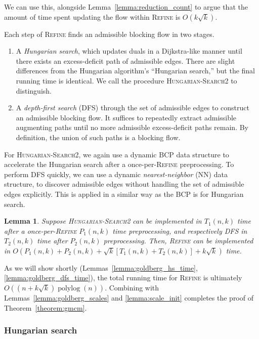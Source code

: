 \documentclass[11pt]{article}
\def\polylog{\mathop{\mathrm{polylog}}}
\theoremstyle{plain}
\newtheorem{lemma}{Lemma}
\begin{document}
We can use this, alongside Lemma~\ref{lemma:reduction_count} to argue that the
amount of time spent updating the flow within \textsc{Refine} is
$O(k\sqrt{k})$.

Each step of \textsc{Refine} finds an admissible blocking flow in two stages.
\begin{enumerate}
\item A \emph{Hungarian search}, which updates duals in a Dijkstra-like
	manner until there exists an excess-deficit path of admissible edges.
	There are slight differences from the Hungarian algorithm's ``Hungarian
	search,'' but the final running time is identical.
	We call the procedure \textsc{Hungarian-Search2} to distinguish.

\item A \emph{depth-first search} (\textsc{DFS}) through the set of admissible
	edges to construct an admissible blocking flow.
	It suffices to repeatedly extract admissible augmenting paths until
	no more admissible excess-deficit paths remain.
	By definition, the union of such paths is a blocking flow.
\end{enumerate}
For \textsc{Hungarian-Search2}, we again use a dynamic BCP data structure to
accelerate the Hungarian search after a once-per-\textsc{Refine} preprocessing.
To perform \textsc{DFS} quickly, we can use a dynamic \emph{nearest-neighbor}
(NN) data structure, to discover admissible edges without handling the set of
admissible edges explicitly.
This is applied in a similar way as the BCP is for Hungarian search.

\begin{lemma}
	Suppose \textsc{Hungarian-Search2} can be implemented in $T_1(n, k)$
	time after a once-per-\textsc{Refine} $P_1(n, k)$ time preprocessing,
	and respectively \textsc{DFS} in $T_2(n, k)$ time after $P_2(n, k)$
	preprocessing.
	Then, \textsc{Refine} can be implemented in
	$O(P_1(n, k) + P_2(n, k) + \sqrt{k}[T_1(n, k) + T_2(n, k)] + k\sqrt{k})$
	time.
\end{lemma}

As we will show shortly (Lemmas~\ref{lemma:goldberg_hs_time},
\ref{lemma:goldberg_dfs_time}), the total running time for \textsc{Refine}
is ultimately $O((n + k\sqrt{k})\polylog(n))$.
Combining with Lemmas~\ref{lemma:goldberg_scales} and \ref{lemma:scale_init}
completes the proof of Theorem~\ref{theorem:gmcm}.

\subsubsection{Hungarian search}
\end{document}
